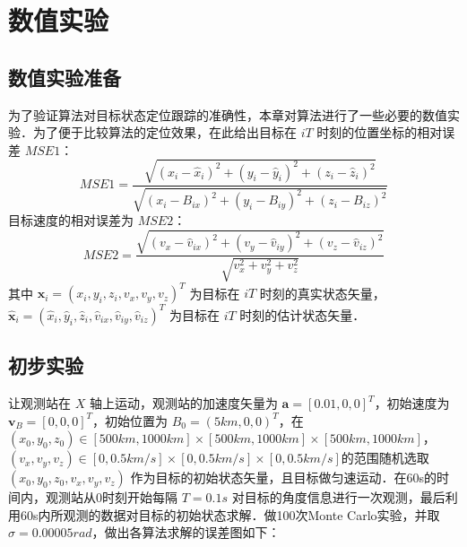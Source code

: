 \chapter{数值实验}
\section{数值实验准备}
为了验证算法对目标状态定位跟踪的准确性，本章对算法进行了一些必要的数值实验．为了便于比较算法的定位效果，在此给出目标在 $iT$ 时刻的位置坐标的相对误差 $MSE1$：
\begin{equation}
	MSE1 = \frac{\sqrt{(x_i-\hat{x}_i)^2 + (y_i -\hat{y}_i)^2 +(z_i -\hat{z}_i)^2}}{\sqrt{(x_i-B_{ix})^2 +(y_i - B_{iy})^2 + (z_i - B_{iz})^2}}
\end{equation}
目标速度的相对误差为 $MSE2$：
\begin{equation}
	MSE2 = \frac{\sqrt{(v_x-\hat{v}_{ix})^2 + (v_y-\hat{v}_{iy})^2 + (v_z-\hat{v}_{iz})^2 }}{\sqrt{v_x^2 +v_y^2 + v_z^2}}
\end{equation}
其中 $\bm{x}_i = (x_i,y_i,z_i,v_x,v_y,v_z)^T$ 为目标在 $iT$ 时刻的真实状态矢量，$\hat{\bm{x}}_i = (\hat{x}_i,\hat{y}_i,\hat{z}_i,\hat{v}_{ix},\hat{v}_{iy},\hat{v}_{iz})^T$ 为目标在 $iT$ 时刻的估计状态矢量．
\section{初步实验}
让观测站在 $X$ 轴上运动，观测站的加速度矢量为
 $\bm{a} = [0.01,0,0]^T$，初始速度为 $\bm{v}_B = [0,0,0]^T$，初始位置为 $B_0 = (5km,0,0)^T$，在 $(x_0,y_0,z_0) \in [500km,1000km]\times[500km,1000km]\times[500km,1000km]$，$(v_x,v_y,v_z) \in [0,0.5km/s]\times[0,0.5km/s]\times[0,0.5km/s]$的范围随机选取 $(x_0,y_0,z_0,v_x,v_y,v_z)$ 作为目标的初始状态矢量，且目标做匀速运动．在60s的时间内，观测站从0时刻开始每隔 $T=0.1s$ 对目标的角度信息进行一次观测，最后利用60s内所观测的数据对目标的初始状态求解．做100次Monte Carlo实验，并取 $\sigma = 0.00005rad$，做出各算法求解的误差图如下：

